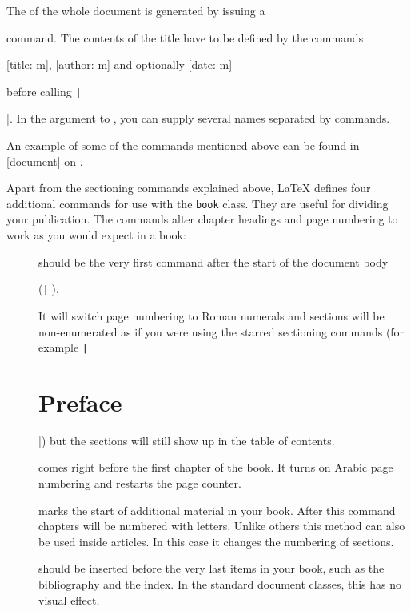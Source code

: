 The  of the whole document is generated by issuing a
\begin{lscommand}
\end{lscommand}
command. The contents of the title have to be defined by the commands
\begin{lscommand}
  [title: m], [author: m]
  and optionally [date: m]
\end{lscommand}
before calling \texttt|\maketitle|. In the argument to , you can supply several names separated by  commands.

An example of some of the commands mentioned above can be found in
\autoref{document} on .

Apart from the sectioning commands explained above, \LaTeX{} defines four
additional commands for use with the \texttt{book} class. They are useful for
dividing your publication. The commands alter chapter headings and page
numbering to work as you would expect in a book:
\begin{description}
  \item[] should be the very first command after the start of
    the document body
    \begin{chktexignore}
  (\texttt||).
\end{chktexignore}
    It will switch page
    numbering to Roman numerals and sections will be non-enumerated as if you were
    using the starred sectioning commands (for example
    \texttt|\chapter*{Preface}|) but the sections will still show up in
    the table of contents.
  \item[] comes right before the first chapter of
    the book. It turns on Arabic page numbering and restarts the page
    counter.
  \item[] marks the start of additional material in your book.
    After this command chapters will be numbered with letters. Unlike others
    this method can also be used inside articles. In this case it changes the
    numbering of sections.
  \item[] should be inserted before the very last items
    in your book, such as the bibliography and the index. In the standard
    document classes, this has no visual effect.
\end{description}

